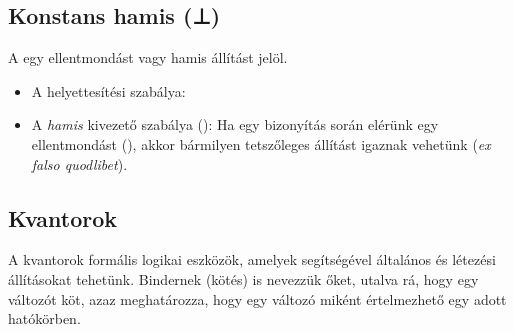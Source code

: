 \subsection{Konstans hamis (⊥)}
A  egy ellentmondást vagy hamis állítást jelöl.
\begin{code}%
%
\>[6]%
\>[12]\AgdaSymbol{:}\AgdaSpace{}%
\AgdaSymbol{\}}\AgdaSpace{}%
\AgdaSpace{}%
\AgdaSpace{}%
\<%
\end{code}

\begin{itemize}
\item A  helyettesítési szabálya:
\begin{code}%
%
\>[6]%
\>[12]\AgdaSymbol{:}\AgdaSpace{}%
\AgdaSpace{}%
\AgdaSymbol{\}\{}\AgdaSpace{}%
\AgdaSymbol{:}\AgdaSpace{}%
\AgdaSpace{}%
\AgdaSpace{}%
\AgdaSymbol{\}}\AgdaSpace{}%
\AgdaSpace{}%
\AgdaSpace{}%
\AgdaOperator{\AgdaField{[}}\AgdaSpace{}%
\AgdaSpace{}%
\AgdaOperator{\AgdaField{]ᶠ}}\AgdaSpace{}%
\AgdaSpace{}%
\<%
\end{code}
\item A \textit{hamis} kivezető szabálya (): Ha egy bizonyítás során elérünk egy ellentmondást (), akkor bármilyen tetszőleges állítást igaznak vehetünk (\textit{ex falso quodlibet}).
\begin{code}%
%
\>[6]%
\>[12]\AgdaSymbol{:}\AgdaSpace{}%
\AgdaSpace{}%
\AgdaSymbol{\}}\AgdaSpace{}%
\AgdaSpace{}%
\AgdaSpace{}%
\AgdaSpace{}%
\AgdaSpace{}%
\AgdaSpace{}%
\AgdaSpace{}%
\AgdaSpace{}%
\<%
\end{code}
\end{itemize}

\subsection{Kvantorok}

A kvantorok formális logikai eszközök, amelyek segítségével általános és létezési állításokat tehetünk. Bindernek (kötés) is nevezzük őket, utalva rá, hogy egy változót köt, azaz meghatározza, hogy egy változó miként értelmezhető egy adott hatókörben.

